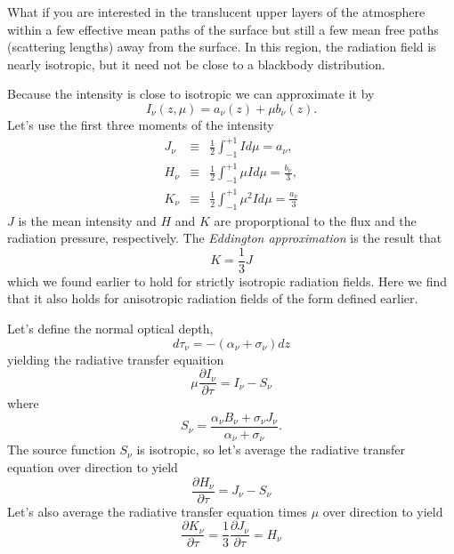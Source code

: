 What if you are interested in the translucent upper layers of 
the atmosphere within a few effective mean paths of the surface but
still a few mean free paths (scattering lengths) away from the surface.  In
this region, the radiation field is nearly isotropic, but it need not
be close to a blackbody distribution.

Because the intensity is close to isotropic we can approximate it by
\begin{equation}
I_\nu (z,\mu) = a_\nu(z) + \mu b_\nu(z).
\label{eq:112}
\end{equation}
Let's use the first three moments of the intensity
\begin{eqnarray}
\label{eq:113}
J_\nu &\equiv& \frac{1}{2} \int_{-1}^{+1} I d\mu = a_\nu, \\
\label{eq:114}
H_\nu &\equiv& \frac{1}{2} \int_{-1}^{+1} \mu I d\mu =
\frac{b_\nu}{3}, \\
K_\nu &\equiv& \frac{1}{2} \int_{-1}^{+1} \mu^2 I d\mu = \frac{a_\nu}{3}
\label{eq:115}
\end{eqnarray}
$J$ is the mean intensity and $H$ and $K$ are proporptional to the
flux and the radiation pressure, respectively.  The {\em Eddington approximation} is
the result that
\begin{equation}
K = \frac{1}{3} J
\label{eq:116}
\end{equation}
which we found earlier to hold for strictly isotropic radiation
fields.  Here we find that it also holds for anisotropic radiation
fields of the form defined earlier.

Let's define the normal optical depth,
\begin{equation}
d \tau_\nu = - \left ( \alpha_\nu + \sigma_\nu \right ) d z
\label{eq:117}
\end{equation}
yielding the radiative transfer equaition
\begin{equation}
\mu \frac{\partial I_\nu}{\partial \tau} = I_\nu - S_\nu
\label{eq:118}
\end{equation}
where 
\begin{equation}
S_\nu = \frac{\alpha_\nu B_\nu + \sigma_\nu J_\nu}{\alpha_\nu + \sigma_\nu}.
\label{eq:119}
\end{equation}
The source function $S_\nu$ is isotropic, so let's average the
radiative transfer equation over direction to yield
\begin{equation}
\frac{\partial H_\nu}{\partial \tau} = J_\nu - S_\nu
\label{eq:120}
\end{equation}
Let's also average the radiative transfer equation times $\mu$ over
direction to yield
\begin{equation}
\frac{\partial K_\nu}{\partial \tau} = \frac{1}{3} \frac{\partial
  J_\nu}{\partial \tau} = H_\nu
\label{eq:121}
\end{equation}
